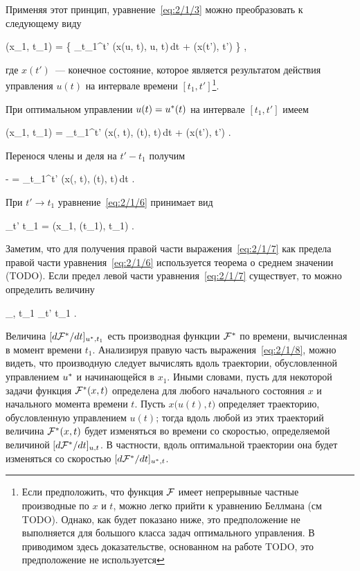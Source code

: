 Применяя этот принцип, уравнение~\ref{eq:2/1/3} можно преобразовать к следующему виду

    \optF(x_1, t_1) =  \biggl\{ \int\limits_{t_1}^{t'} \funcL\bigl(x(u, t), u, t\bigr)\,dt + \optF\bigl(x(t'), t'\bigr) \biggr\} \mbox{,}
\eeq

где $x(t')$~--- конечное состояние, которое является результатом действия управления $u(t)$ на интервале времени $[t_1, t']$\footnote{ Если предположить, что функция $\mathcal{F}$ имеет непрерывные частные производные по $x$ и $t$, можно легко прийти к уравнению Беллмана (см TODO). Однако, как будет показано ниже, это предположение не выполняется для большого класса задач оптимального управления. В приводимом здесь доказательстве, основанном на работе TODO, это предположение не используется }.

При оптимальном управлении $u(t) = u^{*}(t)$ на интервале $[t_1, t']$ имеем

    \optF(x_1, t_1) = \int\limits_{t_1}^{t'} \funcL\bigl(x(\optU, t), \optU(t), t\bigr)\,dt + \optF\bigl(x(t'), t'\bigr) \mbox{.}
\eeq

Перенося члены и деля на $t' - t_1$ получим

    - =  \int\limits_{t_1}^{t'} \funcL\bigl(x(\optU, t), \optU(t), t\bigr)\,dt \mbox{.}
\eeq

При $t' \to t_1$ уравнение~\ref{eq:2/1/6} принимает вид

    \lim_{t' \to t_1}  = \funcL\bigl(x_1, \optU(t_1), t_1\bigr) \mbox{.}
\eeq

Заметим, что для получения правой части выражения~\ref{eq:2/1/7} как предела правой части уравнения~\ref{eq:2/1/6} используется теорема о среднем значении (TODO). Если предел левой части уравнения~\ref{eq:2/1/7} существует, то можно определить величину

    _{\optU, t_1} \eqdef \lim_{t' \to t_1}  \mbox{.}
\eeq

Величина $[ d \mathcal{F}^{*} / d t ]_{u^{*}, t_1}$ есть производная функции $\mathcal{F}^{*}$ по времени, вычисленная в момент времени $t_1$. Анализируя правую часть выражения~\ref{eq:2/1/8}, можно видеть, что производную следует вычислять вдоль траектории, обусловленной управлением $u^{*}$ и начинающейся в $x_1$. Иными словами, пусть для некоторой задачи функция $\mathcal{F}^{*}(x, t)$ определена для любого начального состояния $x$ и начального момента времени $t$. Пусть $x\bigl( u(t), t \bigr)$ определяет траекторию, обусловленную управлением $u(t)$; тогда вдоль любой из этих траекторий величина $\mathcal{F}^{*}(x, t)$ будет изменяться во времени со скоростью, определяемой величиной $[ d \mathcal{F}^{*} / d t ]_{u, t}$. В частности, вдоль оптимальной траектории она будет изменяться со скоростью $[ d \mathcal{F}^{*} / d t ]_{u^{*}, t}$.

